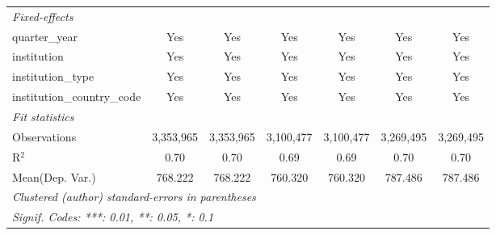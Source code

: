 \begin{tabular}{lcccccc}
   \midrule
   \emph{Fixed-effects}\\
   quarter\_year                      & Yes       & Yes       & Yes       & Yes       & Yes       & Yes\\  
   institution                        & Yes       & Yes       & Yes       & Yes       & Yes       & Yes\\  
   institution\_type                  & Yes       & Yes       & Yes       & Yes       & Yes       & Yes\\  
   institution\_country\_code         & Yes       & Yes       & Yes       & Yes       & Yes       & Yes\\  
   \midrule
   \emph{Fit statistics}\\
   Observations                       & 3,353,965 & 3,353,965 & 3,100,477 & 3,100,477 & 3,269,495 & 3,269,495\\  
   R$^2$                              & 0.70      & 0.70      & 0.69      & 0.69      & 0.70      & 0.70\\  
Mean(Dep. Var.) & 768.222 & 768.222 & 760.320 & 760.320 & 787.486 & 787.486 \\
   \midrule \midrule
   \multicolumn{7}{l}{\emph{Clustered (author) standard-errors in parentheses}}\\
   \multicolumn{7}{l}{\emph{Signif. Codes: ***: 0.01, **: 0.05, *: 0.1}}\\
\end{tabular}
\par\endgroup
